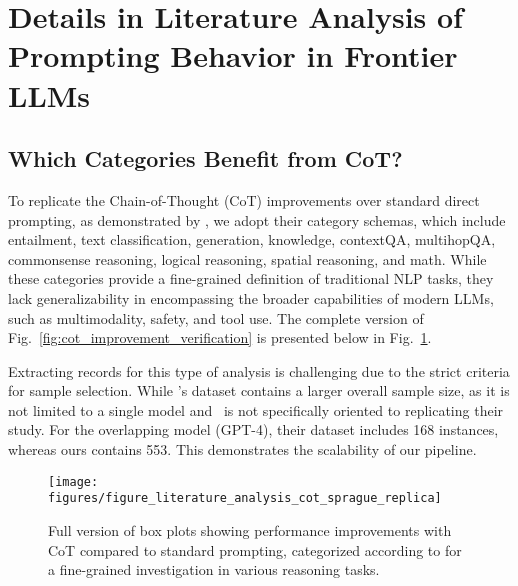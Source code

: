 \section{Details in Literature Analysis of Prompting Behavior in Frontier LLMs}
\label{appendix:details_in_meta_analysis}

\subsection{Which Categories  Benefit from CoT?}

To replicate the Chain-of-Thought (CoT) improvements over standard direct prompting, as demonstrated by \citet{sprague2024cot}, we adopt their category schemas, which include entailment, text classification, generation, knowledge, contextQA, multihopQA, commonsense reasoning, logical reasoning, spatial reasoning, and math. 
While these categories provide a fine-grained definition of traditional NLP tasks, they lack generalizability in encompassing the broader capabilities of modern LLMs, such as multimodality, safety, and tool use. 
The complete version of Fig.~\ref{fig:cot_improvement_verification} is presented below in Fig.~\ref{fig:cot_improvement_verification_full}.


Extracting records for this type of analysis is challenging due to the strict criteria for sample selection. 
While \citet{sprague2024cot}'s dataset contains a larger overall sample size, as it is not limited to a single model and \datasetname~is not specifically oriented to replicating their study. 
For the overlapping model (GPT-4), their dataset includes 168 instances, whereas ours contains 553. This demonstrates the scalability of our pipeline.

\begin{figure}[t!]
    \centering  
    \texttt{[image: figures/figure\_literature\_analysis\_cot\_sprague\_replica]}
    \caption{Full version of box plots showing performance improvements with CoT compared to standard prompting, categorized according to \citet{sprague2024cot} for a fine-grained investigation in various reasoning tasks.}
    \label{fig:cot_improvement_verification_full}
\end{figure}


